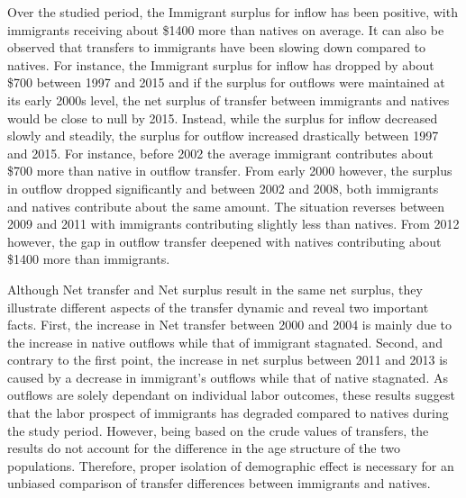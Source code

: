   \vspace{0.7em}\par
  Over the studied period, the Immigrant surplus for inflow has been positive, with immigrants receiving about \$1400 more than natives on average.
It can also be observed that transfers to immigrants have been slowing down compared to natives.
For instance, the Immigrant surplus for inflow has dropped by about \$700 between 1997 and 2015 and if the surplus for outflows were maintained at its early 2000s level, the net surplus of transfer between immigrants and natives would be close to null by 2015.
Instead, while the surplus for inflow decreased slowly and steadily, the surplus for outflow increased drastically between 1997 and 2015.
For instance, before 2002 the average immigrant contributes about \$700 more than native in outflow transfer.
From early 2000 however, the surplus in outflow dropped significantly and between 2002 and 2008, both immigrants and natives contribute about the same amount.
The situation reverses between 2009 and 2011 with immigrants contributing slightly less than natives.
From 2012 however, the gap in outflow transfer deepened with natives contributing about \$1400 more than immigrants.

  \vspace{0.7em}\par
  Although Net transfer and Net surplus result in the same net surplus, they illustrate different aspects of the transfer dynamic and reveal two important facts.
First, the increase in Net transfer between 2000 and 2004 is mainly due to the increase in native outflows while that of immigrant stagnated.
Second, and contrary to the first point, the increase in net surplus between 2011 and 2013 is caused by a decrease in immigrant's outflows while that of native stagnated.
As outflows are solely dependant on individual labor outcomes, these results suggest that the labor prospect of immigrants has degraded compared to natives during the study period.
However, being based on the crude values of transfers, the results do not account for the difference in the age structure of the two populations.
Therefore, proper isolation of demographic effect is necessary for an unbiased comparison of transfer differences between immigrants and natives.















